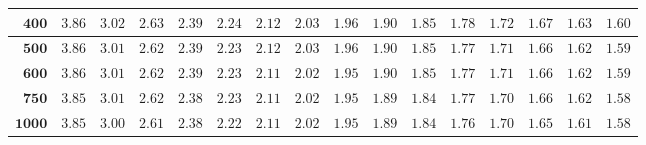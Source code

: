 \begin{alternateColorTable}
\begin{longtable}{|r|r|r|r|r|r|r|r|r|r|r|r|r|r|r|r|}
    \(\mathbf{400}\) & \(3.86\) & \(3.02\) & \(2.63\) & \(2.39\) & \(2.24\) & \(2.12\) & \(2.03\) & \(1.96\) & \(1.90\) & \(1.85\) & \(1.78\) & \(1.72\) & \(1.67\) & \(1.63\) & \(1.60\) \\ \hline
    \(\mathbf{500}\) & \(3.86\) & \(3.01\) & \(2.62\) & \(2.39\) & \(2.23\) & \(2.12\) & \(2.03\) & \(1.96\) & \(1.90\) & \(1.85\) & \(1.77\) & \(1.71\) & \(1.66\) & \(1.62\) & \(1.59\) \\ \hline
    \(\mathbf{600}\) & \(3.86\) & \(3.01\) & \(2.62\) & \(2.39\) & \(2.23\) & \(2.11\) & \(2.02\) & \(1.95\) & \(1.90\) & \(1.85\) & \(1.77\) & \(1.71\) & \(1.66\) & \(1.62\) & \(1.59\) \\ \hline
    \(\mathbf{750}\) & \(3.85\) & \(3.01\) & \(2.62\) & \(2.38\) & \(2.23\) & \(2.11\) & \(2.02\) & \(1.95\) & \(1.89\) & \(1.84\) & \(1.77\) & \(1.70\) & \(1.66\) & \(1.62\) & \(1.58\) \\ \hline
    \(\mathbf{1000}\) & \(3.85\) & \(3.00\) & \(2.61\) & \(2.38\) & \(2.22\) & \(2.11\) & \(2.02\) & \(1.95\) & \(1.89\) & \(1.84\) & \(1.76\) & \(1.70\) & \(1.65\) & \(1.61\) & \(1.58\) \\ \hline


\end{longtable}
\end{alternateColorTable}
\changefontsizes{11pt}
\newpage

